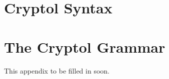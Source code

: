 \chapter{Cryptol Syntax}
\label{cha:crypt-synt}


\label{sec:crypt-synt-summ}


\chapter{The Cryptol Grammar}
\label{cha:cryptol-grammar}

This appendix to be filled in soon.

